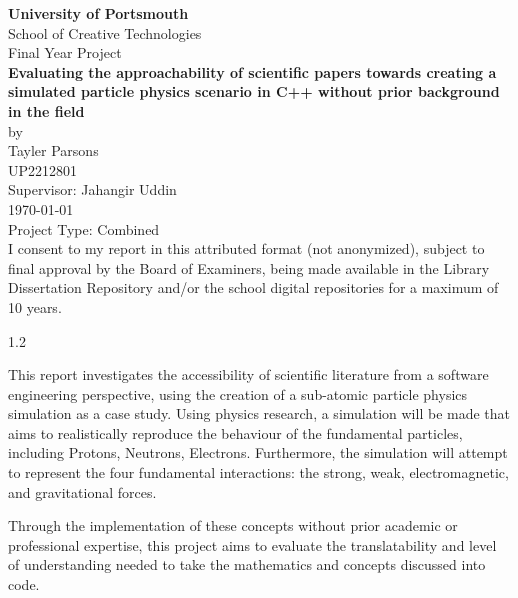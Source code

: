\documentclass[12pt,a4paper]{report}
\begin{document}
\begin{titlepage}
  \begin{center}
        {\bfseries\LARGE University of Portsmouth}\\[1em]
        {\Large School of Creative Technologies}\\[4em]

        {\large Final Year Project}\\[1em]
        
        {\Large\bfseries Evaluating the approachability of scientific papers towards creating a simulated particle physics scenario in C++ without prior background in the field}\\[2em]

        {\Large by}\\[1.0em]
        {\Large Tayler Parsons}\\
        {\Large UP2212801}\\[2em]

        Supervisor: Jahangir Uddin\\[1em]
        \today\\[2em]

        Project Type: Combined\\[1em]

        I consent to my report in this attributed format (not anonymized), subject to final approval by the Board of Examiners, 
        being made available in the Library Dissertation Repository and/or the school digital repositories for a maximum of 10 years.

        \vspace{1em}
         \hspace{0.25em} 

    \end{center}

    \vfill

    \setlength{\headheight}{14.5pt}
    \begin{spacing}{1.2}

   This report investigates the accessibility of scientific literature from a software engineering perspective, using the creation of a sub-atomic particle physics simulation
   as a case study. Using physics research, a simulation will be made that aims to realistically reproduce the behaviour of the fundamental particles, including Protons,
   Neutrons, Electrons. Furthermore, the simulation will attempt to represent the four fundamental interactions: the strong, weak, electromagnetic, and gravitational forces.

   Through the implementation of these concepts without prior academic or professional expertise, this project aims to evaluate the translatability and level of understanding
   needed to take the mathematics and concepts discussed into code.
  \end{spacing}
\end{titlepage}
\end{document}
